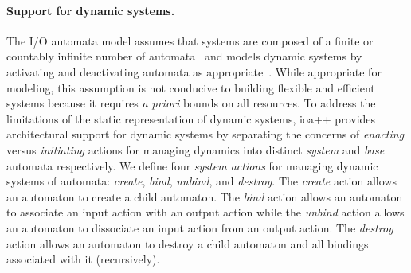 \paragraph*{Support for dynamic systems.}
The I/O automata model assumes that systems are composed of a finite or countably infinite number of automata~\cite{lynch1996distributed} and models dynamic systems by activating and deactivating automata as appropriate~\cite{lynch1994atomic}.
While appropriate for modeling, this assumption is not conducive to building flexible and efficient systems because it requires \emph{a priori} bounds on all resources.
To address the limitations of the static representation of dynamic systems, ioa++ provides architectural support for dynamic systems by separating the concerns of \emph{enacting} versus \emph{initiating} actions for managing dynamics into distinct \emph{system} and \emph{base} automata respectively.
We define four \emph{system actions} for managing dynamic systems of automata: \emph{create}, \emph{bind}, \emph{unbind}, and \emph{destroy}.
The \emph{create} action allows an automaton to create a child automaton.
The \emph{bind} action allows an automaton to associate an input action with an output action while the \emph{unbind} action allows an automaton to dissociate an input action from an output action.
The \emph{destroy} action allows an automaton to destroy a child automaton and all bindings associated with it (recursively).

